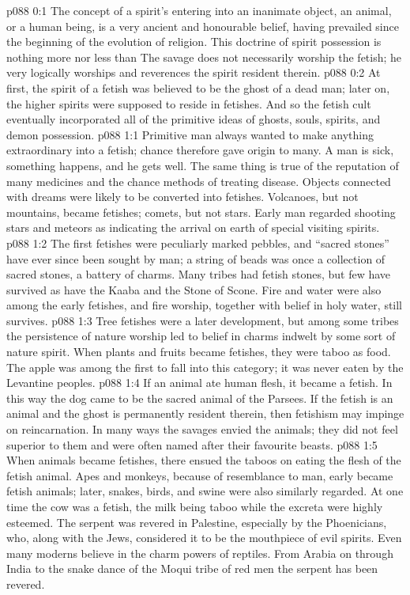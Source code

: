 \author{Brilliant Evening Star}
\vs p088 0:1 The concept of a spirit’s entering into an inanimate object, an animal, or a human being, is a very ancient and honourable belief, having prevailed since the beginning of the evolution of religion. This doctrine of spirit possession is nothing more nor less than  The savage does not necessarily worship the fetish; he very logically worships and reverences the spirit resident therein.
\vs p088 0:2 At first, the spirit of a fetish was believed to be the ghost of a dead man; later on, the higher spirits were supposed to reside in fetishes. And so the fetish cult eventually incorporated all of the primitive ideas of ghosts, souls, spirits, and demon possession.
\vs p088 1:1 Primitive man always wanted to make anything extraordinary into a fetish; chance therefore gave origin to many. A man is sick, something happens, and he gets well. The same thing is true of the reputation of many medicines and the chance methods of treating disease. Objects connected with dreams were likely to be converted into fetishes. Volcanoes, but not mountains, became fetishes; comets, but not stars. Early man regarded shooting stars and meteors as indicating the arrival on earth of special visiting spirits.
\vs p088 1:2 The first fetishes were peculiarly marked pebbles, and “sacred stones” have ever since been sought by man; a string of beads was once a collection of sacred stones, a battery of charms. Many tribes had fetish stones, but few have survived as have the Kaaba and the Stone of Scone. Fire and water were also among the early fetishes, and fire worship, together with belief in holy water, still survives.
\vs p088 1:3 Tree fetishes were a later development, but among some tribes the persistence of nature worship led to belief in charms indwelt by some sort of nature spirit. When plants and fruits became fetishes, they were taboo as food. The apple was among the first to fall into this category; it was never eaten by the Levantine peoples.
\vs p088 1:4 If an animal ate human flesh, it became a fetish. In this way the dog came to be the sacred animal of the Parsees. If the fetish is an animal and the ghost is permanently resident therein, then fetishism may impinge on reincarnation. In many ways the savages envied the animals; they did not feel superior to them and were often named after their favourite beasts.
\vs p088 1:5 When animals became fetishes, there ensued the taboos on eating the flesh of the fetish animal. Apes and monkeys, because of resemblance to man, early became fetish animals; later, snakes, birds, and swine were also similarly regarded. At one time the cow was a fetish, the milk being taboo while the excreta were highly esteemed. The serpent was revered in Palestine, especially by the Phoenicians, who, along with the Jews, considered it to be the mouthpiece of evil spirits. Even many moderns believe in the charm powers of reptiles. From Arabia on through India to the snake dance of the Moqui tribe of red men the serpent has been revered.
